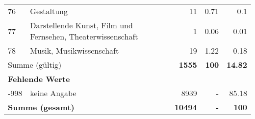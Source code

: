 \begin{longtable}{lXrrr}
        76 & \multicolumn{1}{X}{Gestaltung} & %
          \num{11} &
          \num[round-mode=places,round-precision=2]{0.71} &
          \num[round-mode=places,round-precision=2]{0.1} \\

        77 & \multicolumn{1}{X}{Darstellende Kunst, Film und Fernsehen, Theaterwissenschaft} & %
          \num{1} &
          \num[round-mode=places,round-precision=2]{0.06} &
          \num[round-mode=places,round-precision=2]{0.01} \\

        78 & \multicolumn{1}{X}{Musik, Musikwissenschaft} & %
          \num{19} &
          \num[round-mode=places,round-precision=2]{1.22} &
          \num[round-mode=places,round-precision=2]{0.18} \\

     \midrule
     \multicolumn{2}{l}{Summe (gültig)} &
       \textbf{\num{1555}} &
     \textbf{\num{100}} &
       \textbf{\num[round-mode=places,round-precision=2]{14.82}} \\
     \multicolumn{5}{l}{\textbf{Fehlende Werte}}\\
       -998 &
       keine Angabe &
         \num{8939} &
        - &
         \num[round-mode=places,round-precision=2]{85.18} \\
     \midrule
     \multicolumn{2}{l}{\textbf{Summe (gesamt)}} &
          \textbf{\num{10494}} &
        \textbf{-} &
        \textbf{\num{100}} \\
     \bottomrule
     \end{longtable}
     
